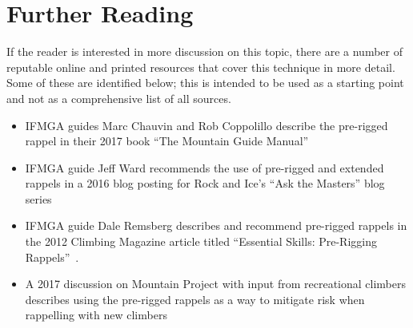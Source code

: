 \documentclass[nonacm,acmtog]{acmart}
\begin{document}
\begin{comment}
\section{CTAC Endorsement and Recommendation}

  CTAC endorses the use of pre-rigged rappels whenever safe to do and when the
  conditions described in Downsides to Pre-rigging a rappel are not present.
  Furthermore, the CTAC majority opinion---with some dissenting opinions ---is
  that pre-rigging should be the standard operating procedure taught by The
  Mountaineers' climbing classes used on Mountaineers' field trips again under
  safe conditions.
\end{comment}

\section{Further Reading}
\label{sec:reading}

If the reader is interested in more discussion on this topic, there are a
number of reputable online and printed resources that cover this technique in
more detail.  Some of these are identified below; this is intended to be used
as a starting point and not as a comprehensive list of all sources.

\begin{itemize}
\item IFMGA guides Marc Chauvin and Rob Coppolillo describe the pre-rigged
   rappel in their 2017 book ``The Mountain Guide Manual'' \cite[pp. 182-183]{mgm}
\item IFMGA guide Jeff Ward recommends the use of pre-rigged and extended
   rappels in a 2016 blog posting for Rock and Ice's ``Ask the Masters'' blog
   series~\cite{www:ri-askthemaster-prerigged}
\item IFMGA guide Dale Remsberg describes and recommend pre-rigged rappels in
   the 2012 Climbing Magazine article titled ``Essential Skills: Pre-Rigging
   Rappels''~\cite{www:climbing-prerigged}.
\item A 2017 discussion on Mountain Project with input from recreational
   climbers describes using the pre-rigged rappels as a way to mitigate risk
   when rappelling with new climbers~\cite{www:mp-prerigged}
\end{itemize}
\end{document}
